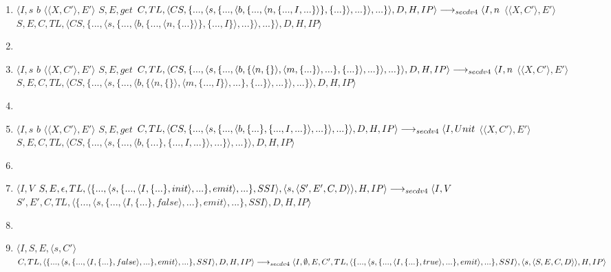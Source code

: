 \documentclass[10pt,a4paper]{article}
\begin{document}
\begin{enumerate}
				\item $\langle I,s$ $b$ $\langle\langle X,C'\rangle,E'\rangle$ $S,E,get$ $C,TL,\langle CS,\{...,\langle s,\{...,\langle b,\{...,\langle n,\{...,I,...\}\rangle\},\{...\}\rangle,...\}\rangle,...\}\rangle,D,H,IP\rangle \\\longrightarrow_{secdv4} \langle I,n$ $\langle\langle X,C'\rangle,E'\rangle$ $S,E,C,TL,\langle CS,\{...,\langle s,\{...,\langle b,\{...,\langle n,\{...\}\rangle\},\{...,I\}\rangle,...\}\rangle,...\}\rangle,D,H,IP\rangle$
				\item[]
				\item $\langle I,s$ $b$ $\langle\langle X,C'\rangle,E'\rangle$ $S,E,get$ $C,TL,\langle CS,\{...,\langle s,\{...,\langle b,\{\langle n,\{\}\rangle,\langle m,\{...\}\rangle,...\},\{...\}\rangle,...\}\rangle,...\}\rangle,D,H,IP\rangle \\\longrightarrow_{secdv4} \langle I,n$ $\langle\langle X,C'\rangle,E'\rangle$ $S,E,C,TL,\langle CS,\{...,\langle s,\{...,\langle b,\{\langle n,\{\}\rangle,\langle m,\{...,I\}\rangle,...\},\{...\}\rangle,...\}\rangle,...\}\rangle,D,H,IP\rangle$
				\item[]
				\item $\langle I,s$ $b$ $\langle\langle X,C'\rangle,E'\rangle$ $S,E,get$ $C,TL,\langle CS,\{...,\langle s,\{...,\langle b,\{...\},\{...,I,...\}\rangle,...\}\rangle,...\}\rangle,D,H,IP\rangle
				\\\longrightarrow_{secdv4} \langle I,Unit$ $\langle\langle X,C'\rangle,E'\rangle$ $S,E,C,TL,\langle CS,\{...,\langle s,\{...,\langle b,\{...\},\{...,I,...\}\rangle,...\}\rangle,...\}\rangle,D,H,IP\rangle$
				\item[]
				\item $\langle I,V$ $S,E,\epsilon,TL,\langle\{...,\langle s,\{...,\langle I,\{...\},init\rangle,...\},emit\rangle,...\},SSI\rangle,\langle s,\langle S',E',C,D\rangle\rangle,H,IP\rangle 
				\\\longrightarrow_{secdv4} \langle I,V$ $S',E',C,TL,\langle\{...,\langle s,\{...,\langle I,\{...\},false\rangle,...\},emit\rangle,...\},SSI\rangle,D,H,IP\rangle$
				\item[]
				\item $\langle I,S,E,\langle s,C'\rangle$ $C,TL,\langle \{...,\langle s,\{...,\langle I,\{...\},false\rangle,...\},emit\rangle,...\},SSI\rangle,D,H,IP\rangle 
				\\\longrightarrow_{secdv4} \langle I,\emptyset,E,C',TL,\langle \{...,\langle s,\{...,\langle I,\{...\},true\rangle,...\},emit\rangle,...\},SSI\rangle,\langle s,\langle S,E,C,D\rangle\rangle,H,IP\rangle$ 

\end{enumerate}
\end{document}
